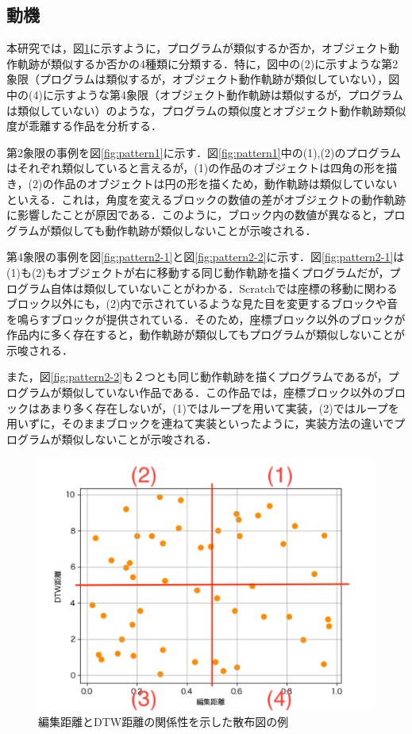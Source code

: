 \documentclass[T,J]{fose} %
\begin{document}
\subsection{動機}\label{subsec:reason}

本研究では，図\ref{fig:sample-scatter}に示すように，プログラムが類似するか否か，オブジェクト動作軌跡が類似するか否かの4種類に分類する．特に，図中の(2)に示すような第2象限（プログラムは類似するが，オブジェクト動作軌跡が類似していない），図中の(4)に示すような第4象限（オブジェクト動作軌跡は類似するが，プログラムは類似していない）のような，プログラムの類似度とオブジェクト動作軌跡類似度が乖離する作品を分析する．

第2象限の事例を図\ref{fig:pattern1}に示す．図\ref{fig:pattern1}中の(1),(2)のプログラムはそれぞれ類似していると言えるが，(1)の作品のオブジェクトは四角の形を描き，(2)の作品のオブジェクトは円の形を描くため，動作軌跡は類似していないといえる．これは，角度を変えるブロックの数値の差がオブジェクトの動作軌跡に影響したことが原因である．このように，ブロック内の数値が異なると，プログラムが類似しても動作軌跡が類似しないことが示唆される．

第4象限の事例を図\ref{fig:pattern2-1}と図\ref{fig:pattern2-2}に示す．図\ref{fig:pattern2-1}は(1)も(2)もオブジェクトが右に移動する同じ動作軌跡を描くプログラムだが，プログラム自体は類似していないことがわかる．Scratchでは座標の移動に関わるブロック以外にも，(2)内で示されているような見た目を変更するブロックや音を鳴らすブロックが提供されている．そのため，座標ブロック以外のブロックが作品内に多く存在すると，動作軌跡が類似してもプログラムが類似しないことが示唆される．

また，図\ref{fig:pattern2-2}も２つとも同じ動作軌跡を描くプログラムであるが，プログラムが類似していない作品である．この作品では，座標ブロック以外のブロックはあまり多く存在しないが，(1)ではループを用いて実装，(2)ではループを用いずに，そのままブロックを連ねて実装といったように，実装方法の違いでプログラムが類似しないことが示唆される．

\begin{figure}[t]
	\centering
	\includegraphics[width=1.0\linewidth]{Okamoto_fig/out-sample.pdf}
	\caption{編集距離とDTW距離の関係性を示した散布図の例}
	\label{fig:sample-scatter}
\end{figure}
\end{document}
